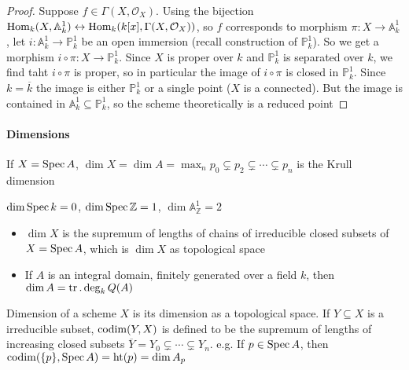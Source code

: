 \documentclass[main]{subfiles}
\begin{document}
\begin{proof}
Suppose $f\in\Gamma(X,\mathcal O_X)$. Using the bijection $\operatorname{Hom}_k(X,\mathbb A_k^1)\leftrightarrow\operatorname{Hom}_k(k[x],\Gamma(X,\mathcal O_X))$, so $f$ corresponds to morphism $\pi:X\to\mathbb A_k^1$, let $i:\mathbb A_k^1\to\mathbb P_k^1$ be an open immersion (recall construction of $\mathbb P_k^1$). So we get a morphism $i\circ\pi:X\to\mathbb P_k^1$. Since $X$ is proper over $k$ and $\mathbb P_k^1$ is separated over $k$, we find taht $i\circ\pi$ is proper, so in particular the image of $i\circ\pi$ is closed in $\mathbb P_k^1$. Since $k=\overline k$ the image is either $\mathbb P_k^1$ or a single point ($X$ is a connected). But the image is contained in $\mathbb A_k^1\subseteq\mathbb P_k^1$, so the scheme theoretically is a reduced point
\end{proof}






\paragraph{Dimensions} If $X=\operatorname{Spec} A$, $\dim X=\dim A=\max_n p_0\subsetneq p_2\subsetneq\cdots\subsetneq p_n$ is the Krull dimension

\begin{example}
$\dim\operatorname{Spec} k=0$, $\dim\operatorname{Spec}\mathbb Z=1$, $\dim\mathbb A_{\mathbb Z}^1=2$
\end{example}

\begin{itemize}
\item $\dim X$ is the supremum of lengths of chains of irreducible closed subsets of $X=\operatorname{Spec} A$, which is $\dim X$ as topological space
\item If $A$ is an integral domain, finitely generated over a field $k$, then $\dim A=\operatorname{tr}.\deg_kQ(A)$
\end{itemize}

\begin{definition}
Dimension of a scheme $X$ is its dimension as a topological space. If $Y\subseteq X$ is a irreducible subset, $\operatorname{codim}(Y,X)$ is defined to be the supremum of lengths of increasing closed subsets $\overline{Y}=Y_0\subsetneq\cdots\subsetneq Y_n$. e.g. If $p\in\operatorname{Spec} A$, then $\operatorname{codim}(\{p\},\operatorname{Spec} A)=\operatorname{ht}(p)=\dim A_p$
\end{definition}
\end{document}
